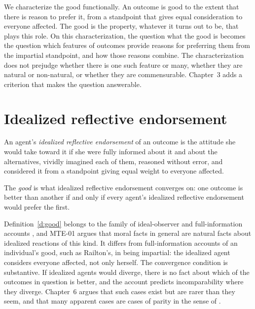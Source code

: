 \documentclass{situationist-preprint}
\begin{document}
We characterize the good functionally. An outcome is good to the extent that there is reason to prefer it, from a standpoint that gives equal consideration to everyone affected. The good is the property, whatever it turns out to be, that plays this role. On this characterization, the question what the good is becomes the question which features of outcomes provide reasons for preferring them from the impartial standpoint, and how those reasons combine. The characterization does not prejudge whether there is one such feature or many, whether they are natural or non-natural, or whether they are commensurable. Chapter~3 adds a criterion that makes the question answerable.

\section{Idealized reflective endorsement}

\begin{definition}\label{d:endorse}
An agent's \emph{idealized reflective endorsement} of an outcome is the attitude she would take toward it if she were fully informed about it and about the alternatives, vividly imagined each of them, reasoned without error, and considered it from a standpoint giving equal weight to everyone affected.
\end{definition}

\begin{definition}\label{d:good}
The \emph{good} is what idealized reflective endorsement converges on: one outcome is better than another if and only if every agent's idealized reflective endorsement would prefer the first.
\end{definition}

Definition~\ref{d:good} belongs to the family of ideal-observer and full-information accounts \citep{Firth1952,Brandt1979,Railton1986}, and MTE-01 argues that moral facts in general are natural facts about idealized reactions of this kind. It differs from full-information accounts of an individual's good, such as Railton's, in being impartial: the idealized agent considers everyone affected, not only herself. The convergence condition is substantive. If idealized agents would diverge, there is no fact about which of the outcomes in question is better, and the account predicts incomparability where they diverge. Chapter~6 argues that such cases exist but are rarer than they seem, and that many apparent cases are cases of parity in the sense of \citet{Chang2002}.
\end{document}
